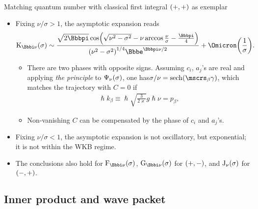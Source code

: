 \documentclass[9pt]{beamer}
\begin{document}
\begin{frame}%
{Matching quantum number with classical first integral}%
{${\left(+,+\right)}$ as exemplar}
\begin{itemize}
\item Fixing $\nu/\sigma>1$, the asymptotic expansion
reads
\begin{align}
\rfun{\mathrm{K}_{\ii \nu}}{\sigma} \sim
\frac{\sqrt{2\pp}\,
\rfun{\cos}{\sqrt{\nu^2-\sigma^2}-\nu\arccos\frac{\nu}{\sigma}-\frac{\pp}{4}}
}{
\rbr{\nu^2-\sigma^2}^{1/4}\ee^{\pp\nu/2}}
+\rfun{\Omicron}{\frac{1}{\sigma}}.
\end{align}
\begin{itemize}
\item There are two phases with opposite signs.
Assuming $c_i$, $a_j$'s are real and applying \emph{the principle} to 
${\Psi_\nu}\mathopen{}\left(\sigma\right)\mathclose{}$, one has$\sigma/\nu = 
\rfun{\sech}{\mscrs_\beta\gamma}$, which matches the trajectory with $C = 0$ if
\begin{align}
\hslash k_\beta \equiv \hslash \sqrt{\frac{3}{2\varkappa}}g\hslash\nu
= p_\beta,
\end{align}

\item Non-vanishing $C$ can be compensated by the phase of $c_i$ and $a_j$'s.
\end{itemize}

\item Fixing $\nu/\sigma<1$, the asymptotic expansion is not oscillatory,
but exponential; it is not within the WKB regime.
\end{itemize}

\begin{itemize}
\item The conclusions also hold for $\rfun{\mathrm{F}_{\ii\nu}}{\sigma}$, 
$\rfun{\mathrm{G}_{\ii\nu}}{\sigma}$ for ${\left(+,-\right)}$, and
${\mathrm{J}_{\nu}}\mathopen{}\left(\sigma\right)\mathclose{}$ for ${\left(-,+\right)}$.
\end{itemize}
\end{frame}

\subsection{Inner product and wave packet}
\end{document}
